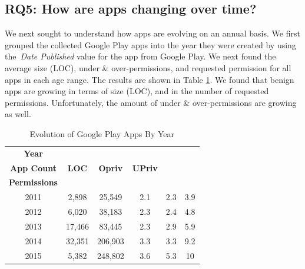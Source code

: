 \documentclass{llncs}
\begin{document}
\subsection{RQ5: How are apps changing over time?}
We next sought to understand how apps are evolving on an annual basis. We first grouped the collected Google Play apps into the year they were created by using the~\emph{Date Published} value for the app from Google Play. We next found the average size (LOC), under \& over-permissions, and requested permission for all apps in each age range. The results are shown in Table \ref{Table:appsByYear}. We found that benign apps are growing in terms of size (LOC), and in the number of requested permissions. Unfortunately, the amount of under \& over-permissions are growing as well.

\begin{table}
\begin{center}
\caption{Evolution of Google Play Apps By Year}
\label{Table:appsByYear}
 \begin{tabular}{ | c | c | c | c | c | c |  } \hline

  \bfseries ~~~Year~~~ & \begin{tikzpicture}
  \node[align=center, text height=3.5ex]{\bfseries Collected\\[1.2pt]\bfseries App Count};
\end{tikzpicture}
 & \bfseries LOC & \bfseries Opriv & \bfseries UPriv &

        \begin{tikzpicture}
            \node[align=center, text height=3.0ex]{\bfseries Requested\\[1.2pt]\bfseries Permissions};
        \end{tikzpicture}

 \\ \hline

	2011 & 2,898 &  25,549 & 2.1 & 2.3 & 3.9   \\ \hline
	2012 & 6,020 & 38,183 & 2.3 & 2.4 & 4.8   \\ \hline
	2013 & 17,466 & 83,445  & 2.3 & 2.9 & 5.9   \\ \hline
	2014 & 32,351 & 206,903  & 3.3 & 3.3 & 9.2  \\ \hline
	2015 & 5,382 & 248,802 & 3.6 & 5.3 & 10  \\ \hline

  \end{tabular}
  \end{center}
\end{table}
\end{document}
